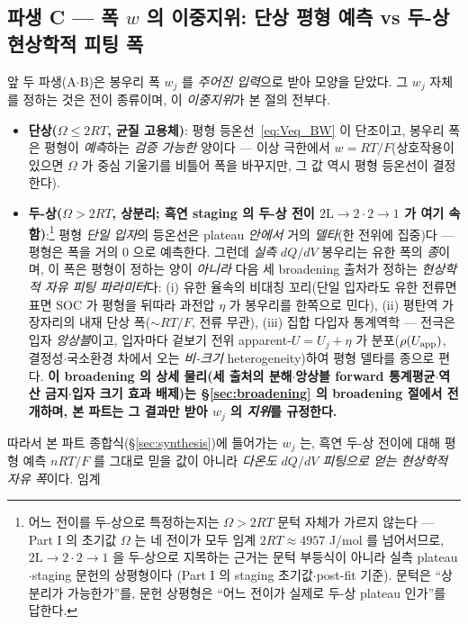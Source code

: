 \subsection{파생 C --- 폭 $w$ 의 이중지위: 단상 평형 예측 vs 두-상 현상학적 피팅 폭}\label{ssec:weff}
앞 두 파생(A$\cdot$B)은 봉우리 폭 $w_j$ 를 \emph{주어진 입력}으로 받아 모양을 닫았다. 그 $w_j$ 자체를 정하는
것은 전이 종류이며, 이 \emph{이중지위}가 본 절의 전부다.
\begin{itemize}[leftmargin=1.4em,itemsep=2pt]
\item \textbf{단상($\Omega\le2RT$, 균질 고용체)}: 평형 등온선~\eqref{eq:Veq_BW} 이 단조이고, 봉우리 폭은 평형이
\emph{예측}하는 \emph{검증 가능한} 양이다 --- 이상 극한에서 $w=RT/F$(상호작용이 있으면 $\Omega$ 가 중심
기울기를 비틀어 폭을 바꾸지만, 그 값 역시 평형 등온선이 결정한다).
\item \textbf{두-상($\Omega>2RT$, 상분리; 흑연 staging 의 두-상 전이 $2\mathrm L\!\to\!2\cdot2\!\to\!1$ 가 여기
속함)}:\footnote{어느 전이를 두-상으로 특정하는지는 $\Omega>2RT$ 문턱 자체가 가르지 않는다 --- Part I 의
초기값 $\Omega$ 는 네 전이가 모두 임계 $2RT\approx4957$ J/mol 를 넘어서므로, $2\mathrm L\!\to\!2\cdot2\!\to\!1$
을 두-상으로 지목하는 근거는 문턱 부등식이 아니라 실측 plateau$\cdot$staging 문헌의 상평형이다
\cite{dahn1991,ohzuku1993}(Part I 의 staging 초기값$\cdot$post-fit 기준). 문턱은 ``상분리가 가능한가''를, 문헌 상평형은 ``어느 전이가 실제로 두-상
plateau 인가''를 답한다.} 평형 \emph{단일 입자}의 등온선은 plateau \emph{안에서} 거의 \emph{델타}(한 전위에 집중)다 --- 평형은
폭을 거의 $0$ 으로 예측한다. 그런데 \emph{실측} $dQ/dV$ 봉우리는 유한 폭의 \emph{종}이며, 이 폭은 평형이 정하는
양이 \emph{아니라} 다음 세 broadening 출처가 정하는 \emph{현상학적 자유 피팅 파라미터}다: (i) 유한 율속의
비대칭 꼬리(단일 입자라도 유한 전류면 표면 SOC 가 평형을 뒤따라 과전압 $\eta$ 가 봉우리를 한쪽으로 민다),
(ii) 평탄역 가장자리의 내재 단상 폭($\sim RT/F$, 전류 무관), (iii) 집합 다입자 통계역학 --- 전극은 입자
\emph{앙상블}이고, 입자마다 겉보기 전위 apparent-$U=U_j+\eta$ 가 분포($\rho(U_{\mathrm{app}})$, 결정성$\cdot$국소환경
차에서 오는 \emph{비-크기} heterogeneity)하여 평형 델타를 종으로 편다. \textbf{이 broadening 의 상세 물리(세
출처의 분해$\cdot$앙상블 forward 통계평균$\cdot$역산 금지$\cdot$입자 크기 효과 배제)는 \S\ref{sec:broadening} 의
broadening 절에서 전개하며, 본 파트는 그 결과만 받아 $w_j$ 의 \emph{지위}를 규정한다.}
\end{itemize}
따라서 본 파트 종합식(\S\ref{sec:synthesis})에 들어가는 $w_j$ 는, 흑연 두-상 전이에 대해 평형 예측
$nRT/F$ 를 그대로 믿을 값이 아니라 \emph{다온도 $dQ/dV$ 피팅으로 얻는 현상학적 자유 폭}이다. 임계
